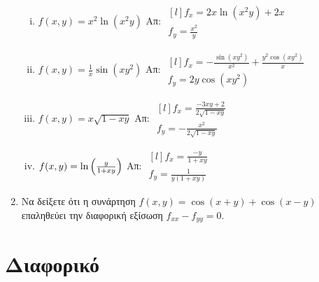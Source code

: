 \documentclass[a4paper,table]{report}
\begin{document}
\begin{enumerate}
\begin{enumerate}[i)]
      \item $ f(x,y) = x^{2} \ln{(x^{2}y)} $ \hfill Απ: $ 
        \begin{matrix*}[l]
          f_{x} = 2x \ln{(x^{2}y)} + 2x \\
          f_{y} = \frac{x^{2}}{y} 
        \end{matrix*} $

      \item $ f(x,y) = \frac{1}{x} \sin{(xy^{2})} $ \hfill Απ: $ 
        \begin{matrix*}[l]
          f_{x} = - \frac{\sin{(xy^{2})}}{x^{2}} + \frac{y^{2} \cos{(xy^{2})}}{x} 
          \\[5pt]
          f_{y} = 2y \cos{(xy^{2})}
        \end{matrix*} $

      \item $ f(x,y) = x \sqrt{1 - xy}$ \hfill Απ: $ 
        \begin{matrix*}[l]
          f_{x} = \frac{-3xy+2}{2 \sqrt{1-xy}} \\ 
          f_{y} = -\frac{x^{2}}{2 \sqrt{1-xy}} 
        \end{matrix*} $

      \item $ f(x,y) = \ln{\Bigl(\frac{y}{1+xy}\Bigr)} $ \hfill Απ: $ 
        \begin{matrix*}[l]
          f_{x} = \frac{-y}{1 + xy} \\ 
          f_{y} = \frac{1}{y(1 + xy)} 
        \end{matrix*} $
    \end{enumerate}

  \item Να δείξετε ότι η συνάρτηση $ f(x,y) = \cos{(x+y)} + \cos{(x-y)} $ 
    επαληθεύει την διαφορική εξίσωση $ f_{xx} - f_{yy} = 0 $.
\end{enumerate}


\section*{Διαφορικό}
\end{document}
